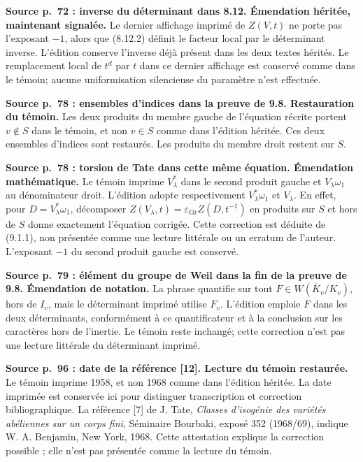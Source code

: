 \documentclass[10pt,letterpaper]{article}
\begin{document}
\begin{description}[style=nextline,leftmargin=2.6em,labelwidth=2.2em,font=\normalfont\bfseries]
\item[E55] \textbf{Source p.~72 : inverse du déterminant dans 8.12. Émendation héritée, maintenant signalée.}
Le dernier affichage imprimé de \(Z(V,t)\) ne porte pas l'exposant \(-1\), alors que (8.12.2) définit le facteur local par le déterminant inverse. L'édition conserve l'inverse déjà présent dans les deux textes hérités. Le remplacement local de \(t^d\) par \(t\) dans ce dernier affichage est conservé comme dans le témoin; aucune uniformisation silencieuse du paramètre n'est effectuée.
\item[E56] \textbf{Source p.~78 : ensembles d'indices dans la preuve de 9.8. Restauration du témoin.}
Les deux produits du membre gauche de l'équation récrite portent \(v\notin S\) dans le témoin, et non \(v\in S\) comme dans l'édition héritée. Ces deux ensembles d'indices sont restaurés. Les produits du membre droit restent sur \(S\).
\item[E57] \textbf{Source p.~78 : torsion de Tate dans cette même équation. Émendation mathématique.}
Le témoin imprime \(V_\lambda^*\) dans le second produit gauche et \(V_\lambda\omega_1\) au dénominateur droit. L'édition adopte respectivement \(V_\lambda^*\omega_1\) et \(V_\lambda\). En effet, pour \(D=V_\lambda^*\omega_1\), décomposer \(Z(V_\lambda,t)=\varepsilon_{\mathrm{Gr}}Z(D,t^{-1})\) en produits sur \(S\) et hors de \(S\) donne exactement l'équation corrigée. Cette correction est déduite de (9.1.1), non présentée comme une lecture littérale ou un erratum de l'auteur. L'exposant \(-1\) du second produit gauche est conservé.
\item[E58] \textbf{Source p.~79 : élément du groupe de Weil dans la fin de la preuve de 9.8. Émendation de notation.}
La phrase quantifie sur tout \(F\in W(\overline K_v/K_v)\), hors de \(I_v\), mais le déterminant imprimé utilise \(F_v\). L'édition emploie \(F\) dans les deux déterminants, conformément à ce quantificateur et à la conclusion sur les caractères hors de l'inertie. Le témoin reste inchangé; cette correction n'est pas une lecture littérale du déterminant imprimé.
\item[E59] \textbf{Source p.~96 : date de la référence [12]. Lecture du témoin restaurée.}
Le témoin imprime 1958, et non 1968 comme dans l'édition héritée. La date imprimée est conservée ici pour distinguer transcription et correction bibliographique. La référence [7] de J. Tate, \emph{Classes d'isogénie des variétés abéliennes sur un corps fini}, Séminaire Bourbaki, exposé 352 (1968/69), indique W. A. Benjamin, New York, 1968. Cette attestation explique la correction possible ; elle n'est pas présentée comme la lecture du témoin.
\end{description}
\end{document}
